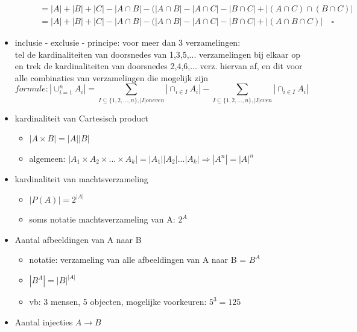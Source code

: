 \documentclass{article}
\begin{document}
\begin{itemize}
\begin{itemize}
\begin{equation*}
\begin{split}
                & = |A| + |B| + |C| - |A \cap B| - (|A \cap B| - |A \cap C| - |B \cap C| + |(A \cap C) \cap (B \cap C)| \\
                & = |A| + |B| + |C| - |A \cap B| - (|A \cap B| - |A \cap C| - |B \cap C| + |(A \cap B \cap C)| \quad \square
            \end{split}
        \end{equation*}
    \end{itemize}
    \item inclusie - exclusie - principe: voor meer dan 3 verzamelingen: \\
    tel de kardinaliteiten van doorsnedes van 1,3,5,... verzamelingen bij elkaar op en trek de kardinaliteiten van doorsnedes 2,4,6,... verz. hiervan af, en dit voor alle combinaties van verzamelingen die mogelijk zijn
    \begin{equation*}
        formule: |\cup_{i=1}^n A_i| = \sum_{I \subseteq \{1,2,...,n\}, |I| oneven} |\cap_{i \in I} A_i| - \sum_{I \subseteq \{1,2,...,n\}, |I| even} |\cap_{i \in I} A_i|
    \end{equation*}
    \item kardinaliteit van Cartesisch product
    \begin{itemize}
        \item $|A \times B| = |A||B|$
        \item algemeen: $|A_1 \times A_2 \times ... \times A_k| = |A_1||A_2|...|A_k| \Rightarrow |A^n| = |A|^n$
    \end{itemize}
    \item kardinaliteit van machtsverzameling
    \begin{itemize}
        \item $|P(A)| = 2^{|A|}$
        \item soms notatie machtsverzameling van A: $2^A$
    \end{itemize}
    \item Aantal afbeeldingen van A naar B
    \begin{itemize}
        \item notatie: verzameling van alle afbeeldingen van A naar B = $B^A$
        \item $|B^A| = |B|^{|A|}$
        \item vb: 3 mensen, 5 objecten, mogelijke voorkeuren: $5^3 = 125$
    \end{itemize}
    \item Aantal injecties $A \rightarrow B$
    \begin{itemize}

\end{itemize}
\end{itemize}
\end{document}
